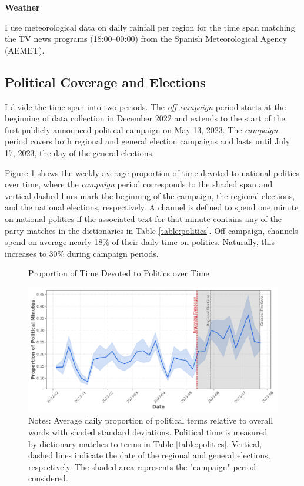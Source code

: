 \documentclass[12pt]{article}
\begin{document}
	\textbf{Weather}
	
	I use meteorological data on daily rainfall per region for the time span matching the TV news programs (18:00–00:00) from the Spanish Meteorological Agency (AEMET).
	
	\subsection{Political Coverage and Elections}
	
	I divide the time span into two periods. The \textit{off-campaign} period starts at the beginning of data collection in December 2022 and extends to the start of the first publicly announced political campaign on May 13, 2023. The \textit{campaign} period covers both regional and general election campaigns and lasts until July 17, 2023, the day of the general elections.
	
	Figure \ref{fig:coverage} shows the weekly average proportion of time devoted to national politics over time, where the \textit{campaign} period corresponds to the shaded span and vertical dashed lines mark the beginning of the campaign, the regional elections, and the national elections, respectively. A channel is defined to spend one minute on national politics if the associated text for that minute contains any of the party matches in the dictionaries in Table \ref{table:politics}. Off-campaign, channels spend on average nearly 18\% of their daily time on politics. Naturally, this increases to 30\% during campaign periods.
	
	
	\begin{figure}[h!]
		\caption{Proportion of Time Devoted to Politics over Time}
		\centering
		\includegraphics[width=120mm]{figures/political_words2}
		\caption*{\small Notes: Average daily proportion of political terms relative to overall words with shaded standard deviations. Political time is measured by dictionary matches to terms in Table \ref{table:politics}. Vertical, dashed lines indicate the date of the regional and general elections, respectively. The shaded area represents the "campaign" period considered.}
		\label{fig:coverage}
	\end{figure}
	
\end{document}
